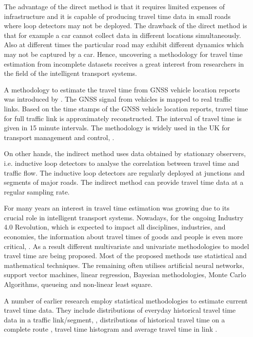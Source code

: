 \documentclass[journal]{IEEEtran}
\begin{document}
The advantage of the direct method is that it requires limited expenses of infrastructure and it is capable of producing travel time data in small roads where loop detectors may not be deployed. The drawback of the direct method is that for example a car cannot collect data in different locations simultaneously. Also at different times the particular road may exhibit different dynamics which may not be captured by a car. Hence, uncovering a methodology for travel time estimation from incomplete datasets receives a great interest from researchers in the field of the intelligent transport systems.

A methodology to estimate the travel time from GNSS vehicle location reports was introduced by \cite{DepartmentofTransport2016}. The GNSS signal from vehicles is mapped to real traffic links. Based on the time stamps of the GNSS vehicle location reports, travel time for full traffic link is approximately reconstructed. The interval of travel time is given in 15 minute intervals. The methodology is widely used in the UK for transport management and control, \cite{DepartmentofTransport2016, Vu2017}.

On other hands, the indirect method uses data obtained by stationary observers, i.e. inductive loop detectors \cite{Huang2008, Li2013, Dong2012, Zhang2015} to analyse the correlation between travel time and traffic flow. The inductive loop detectors are regularly deployed at junctions and segments of major roads. The indirect method can provide travel time data at a regular sampling rate.

For many years an interest in travel time estimation was growing due to its crucial role in intelligent transport systems. Nowadays, for the ongoing Industry 4.0 Revolution, which is expected to impact all disciplines, industries, and economies, the information about travel times of goods and people is even more critical, \cite{Lu2018}. As a result different multivariate and univariate methodologies to model travel time are being proposed. Most of the proposed methods use statistical and mathematical techniques. The remaining often utilises artificial neural networks, support vector machines, linear regression, Bayesian methodologies, Monte Carlo Algorithms, queueing and non-linear least square. 

A number of earlier research employ statistical methodologies to estimate current travel time data. They include distributions of everyday historical travel time data in a traffic link/segment, \cite{Kim2017,Derrmann2016,Wan2014,Jenelius2013,Rahmani2013}, distributions of historical travel time on a complete route \cite{Chitraranjan2016,Rahmani2014}, travel time histogram \cite{Waury2018,Waury2017,Lee2017} and average travel time in link \cite{Yi2015,Ahn2014,Guo2015}.
\end{document}
